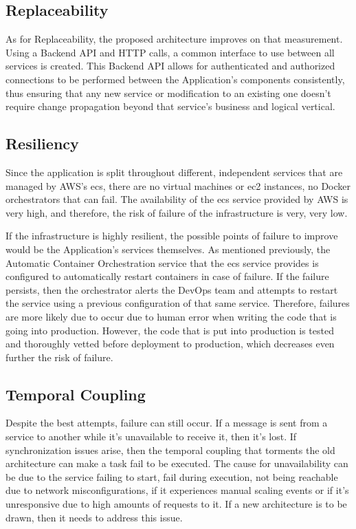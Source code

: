 \subsection{Replaceability}\label{methodology:sss:replaceability-fix}

As for Replaceability, the proposed architecture improves on that measurement. Using a Backend API and HTTP calls, a common interface to use between all services is created. This Backend API allows for authenticated and authorized connections to be performed between the Application's components consistently, thus ensuring that any new service or modification to an existing one doesn't require change propagation beyond that service's business and logical vertical. 

\subsection{Resiliency}\label{methodology:sss:resiliency-fix}

Since the application is split throughout different, independent services that are managed by AWS's \gls{ecs}, there are no virtual machines or \gls{ec2} instances, no Docker orchestrators that can fail.
The availability of the \gls{ecs} service provided by AWS is very high, and therefore, the risk of failure of the infrastructure is very, very low. 

If the infrastructure is highly resilient, the possible points of failure to improve would be the Application's services themselves. As mentioned previously, the Automatic Container Orchestration service that the \gls{ecs} service provides is configured to automatically restart containers in case of failure. If the failure persists, then the orchestrator alerts the DevOps team and attempts to restart the service using a previous configuration of that same service. Therefore, failures are more likely due to occur due to human error when writing the code that is going into production. However, the code that is put into production is tested and thoroughly vetted before deployment to production, which decreases even further the risk of failure.



\subsection{Temporal Coupling}\label{methodology:sss:temporal-coupling}

Despite the best attempts, failure can still occur. If a message is sent from a service to another while it's unavailable to receive it, then it's lost. If synchronization issues arise, then the temporal coupling that torments the old architecture can make a task fail to be executed. The cause for unavailability can be due to the service failing to start, fail during execution, not being reachable due to network misconfigurations, if it experiences manual scaling events or if it's unresponsive due to high amounts of requests to it. If a new architecture is to be drawn, then it needs to address this issue.

